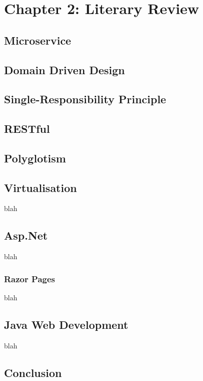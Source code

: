 \section{Chapter 2: Literary Review}
	\subsection{Microservice}
		
	\pagebreak
	\subsection{Domain Driven Design}
	
	\pagebreak
	\subsection{Single-Responsibility Principle}
	
	\pagebreak
	\subsection{RESTful}
	
	\pagebreak
	\subsection{Polyglotism}
	
	\pagebreak
	\subsection{Virtualisation}
	blah
	\pagebreak
	\subsection{Asp.Net}
	blah
		\subsubsection{Razor Pages}
		blah
	\pagebreak
		\subsection{Java Web Development}
	blah
	\pagebreak
	\subsection{Conclusion}
	